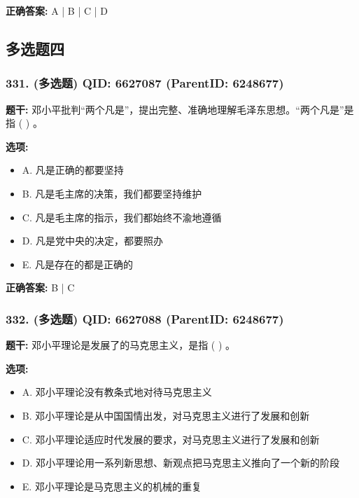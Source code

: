 \documentclass[12pt,UTF8]{ctexart}
\begin{document}
\textbf{正确答案:}
A | B | C | D

\vspace{0.3em}\hrulefill\vspace{0.7em}

\subsection*{多选题四}

\subsubsection*{331. (多选题) \small QID: 6627087 (ParentID: 6248677)}

\textbf{题干:}
邓小平批判“两个凡是”，提出完整、准确地理解毛泽东思想。“两个凡是”是指  ( )  。



\textbf{选项:}
\begin{itemize}[leftmargin=*]

  \item A. 凡是正确的都要坚持

  \item B. 凡是毛主席的决策，我们都要坚持维护

  \item C. 凡是毛主席的指示，我们都始终不渝地遵循

  \item D. 凡是党中央的决定，都要照办

  \item E. 凡是存在的都是正确的

\end{itemize}

\textbf{正确答案:}
B | C

\vspace{0.3em}\hrulefill\vspace{0.7em}

\subsubsection*{332. (多选题) \small QID: 6627088 (ParentID: 6248677)}

\textbf{题干:}
邓小平理论是发展了的马克思主义，是指  ( )  。



\textbf{选项:}
\begin{itemize}[leftmargin=*]

  \item A. 邓小平理论没有教条式地对待马克思主义

  \item B. 邓小平理论是从中国国情出发，对马克思主义进行了发展和创新

  \item C. 邓小平理论适应时代发展的要求，对马克思主义进行了发展和创新

  \item D. 邓小平理论用一系列新思想、新观点把马克思主义推向了一个新的阶段

  \item E. 邓小平理论是马克思主义的机械的重复

\end{itemize}
\end{document}
